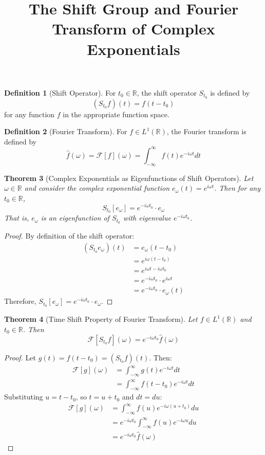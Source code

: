 \documentclass{article}
\title{The Shift Group and Fourier Transform of Complex Exponentials}
\author{}
\date{}
\theoremstyle{plain}
\newtheorem{theorem}{Theorem}
\theoremstyle{definition}
\newtheorem{definition}[theorem]{Definition}
\begin{document}
\maketitle

\begin{definition}[Shift Operator]
For $t_0 \in \mathbb{R}$, the shift operator $S_{t_0}$ is defined by
\[(S_{t_0}f)(t) = f(t - t_0)\]
for any function $f$ in the appropriate function space.
\end{definition}

\begin{definition}[Fourier Transform]
For $f \in L^1(\mathbb{R})$, the Fourier transform is defined by
\[\hat{f}(\omega) = \mathcal{F}[f](\omega) = \int_{-\infty}^{\infty} f(t)e^{-i\omega t} dt\]
\end{definition}

\begin{theorem}[Complex Exponentials as Eigenfunctions of Shift Operators]
Let $\omega \in \mathbb{R}$ and consider the complex exponential function $e_\omega(t) = e^{i\omega t}$. Then for any $t_0 \in \mathbb{R}$,
\[S_{t_0}[e_\omega] = e^{-i\omega t_0} \cdot e_\omega\]
That is, $e_\omega$ is an eigenfunction of $S_{t_0}$ with eigenvalue $e^{-i\omega t_0}$.
\end{theorem}

\begin{proof}
By definition of the shift operator:
\begin{align}
(S_{t_0}e_\omega)(t) &= e_\omega(t - t_0) \\
&= e^{i\omega(t - t_0)} \\
&= e^{i\omega t - i\omega t_0} \\
&= e^{-i\omega t_0} \cdot e^{i\omega t} \\
&= e^{-i\omega t_0} \cdot e_\omega(t)
\end{align}
Therefore, $S_{t_0}[e_\omega] = e^{-i\omega t_0} \cdot e_\omega$.
\end{proof}

\begin{theorem}[Time Shift Property of Fourier Transform]
Let $f \in L^1(\mathbb{R})$ and $t_0 \in \mathbb{R}$. Then
\[\mathcal{F}[S_{t_0}f](\omega) = e^{-i\omega t_0} \hat{f}(\omega)\]
\end{theorem}

\begin{proof}
Let $g(t) = f(t - t_0) = (S_{t_0}f)(t)$. Then:
\begin{align}
\mathcal{F}[g](\omega) &= \int_{-\infty}^{\infty} g(t)e^{-i\omega t} dt \\
&= \int_{-\infty}^{\infty} f(t - t_0)e^{-i\omega t} dt
\end{align}
Substituting $u = t - t_0$, so $t = u + t_0$ and $dt = du$:
\begin{align}
\mathcal{F}[g](\omega) &= \int_{-\infty}^{\infty} f(u)e^{-i\omega(u + t_0)} du \\
&= e^{-i\omega t_0} \int_{-\infty}^{\infty} f(u)e^{-i\omega u} du \\
&= e^{-i\omega t_0} \hat{f}(\omega)
\end{align}
\end{proof}
\end{document}
